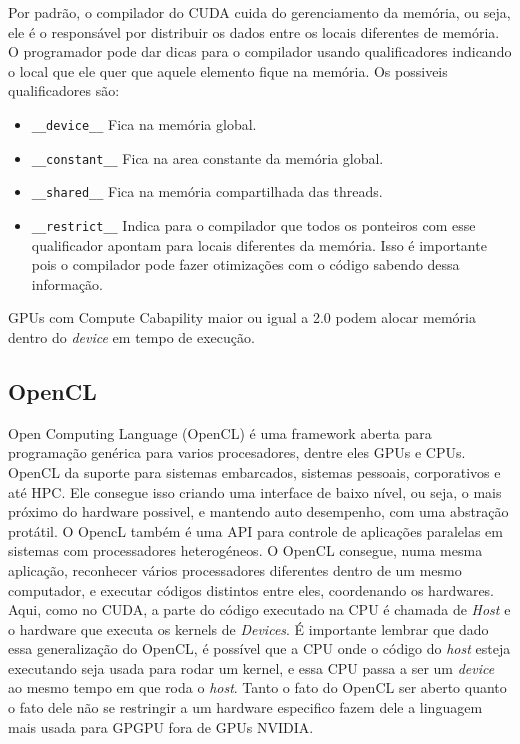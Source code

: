 Por padrão, o compilador do CUDA cuida do gerenciamento da memória, ou seja, ele é o responsável por distribuir os dados 
entre os locais diferentes de memória. O programador pode dar dicas para o compilador usando qualificadores indicando o local
que ele quer que aquele elemento fique na memória. Os possiveis qualificadores são:
\begin{itemize}
  \item \verb#__device__# Fica na memória global.
  \item \verb#__constant__#   Fica na area constante da memória global.
  \item \verb#__shared__# Fica na memória compartilhada das threads.
  \item \verb#__restrict__# Indica para o compilador que todos os ponteiros com esse qualificador apontam para locais diferentes
                            da memória. Isso é importante pois o compilador pode fazer otimizações com o código sabendo dessa informação.   
\end{itemize}

GPUs com Compute Cabapility maior ou igual a 2.0 podem alocar memória dentro do \textit{device} em tempo de execução.

\subsection{OpenCL}
Open Computing Language (OpenCL) é uma framework aberta para programação genérica para varios procesadores, dentre eles GPUs e CPUs.
OpenCL da suporte para sistemas embarcados, sistemas pessoais, corporativos e até HPC. Ele consegue isso criando uma interface
de baixo nível, ou seja, o mais próximo do hardware possivel, e mantendo auto desempenho, com uma abstração protátil. O OpencL
também é uma API para controle de aplicações paralelas em sistemas com processadores heterogéneos. O OpenCL consegue, numa mesma
aplicação, reconhecer vários processadores diferentes dentro de um mesmo computador, e executar códigos distintos entre eles,
coordenando os hardwares. Aqui, como no CUDA, a parte do código executado na CPU é chamada de \textit{Host} e o hardware
que executa os kernels de \textit{Devices}. É importante lembrar que dado essa generalização do OpenCL, é possível que a CPU
onde o código do \textit{host} esteja executando seja usada para rodar um kernel, e essa CPU passa a ser um \textit{device}
ao mesmo tempo em que roda o \textit{host}. Tanto o fato do OpenCL ser aberto quanto o fato dele não se restringir a um
hardware especifico fazem dele a linguagem mais usada para GPGPU fora de GPUs NVIDIA.

